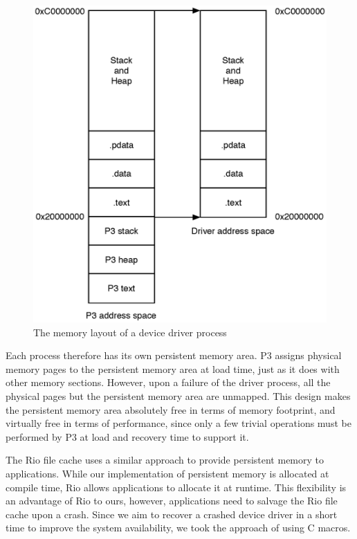 \documentclass{report}
\begin{document}
\begin{figure}[ht]
\begin{center}
\includegraphics[scale=0.6]{layout}
\caption{The memory layout of a device driver process}
\label{fig:layout}
\end{center}
\end{figure}

Each process therefore has its own persistent memory area. P3 assigns physical memory pages to the persistent memory area at load time, just as it does with other memory sections. However, upon a failure of the driver process, all the physical pages but the persistent memory area are unmapped. This design makes the persistent memory area absolutely free in terms of memory footprint, and virtually free in terms of performance, since only a few trivial operations must be performed by P3 at load and recovery time to support it.

The Rio file cache uses a similar approach to provide persistent memory to applications\cite{chen96the-rio-file}.  While our implementation of persistent memory is allocated at compile time, Rio allows applications to allocate it at runtime.  This flexibility is an advantage of Rio to ours, however, applications need to salvage the Rio file cache upon a crash.  Since we aim to recover a crashed device driver in a short time to improve the system availability, we took the approach of using C macros.
\end{document}
